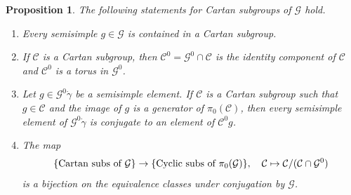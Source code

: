 \documentclass[10pt]{article}
\newtheorem{prop}{Proposition}
\theoremstyle{definition}
\theoremstyle{remark}
\newcommand{\cC}{{{\mathcal C}}}
\newcommand{\cG}{{{\mathcal G}}}
\begin{document}
\begin{prop} 
The following statements for Cartan subgroups of $\cG$ hold. 
  \begin{enumerate}
  \item Every semisimple $g\in \cG$ is contained in a Cartan subgroup.
  \item If $\cC$ is a Cartan subgroup, then $\cC^0=\cG^0\cap \cC$ is the identity component of $\cC$ and $\cC^0$ is a torus in $\cG^0$.
  \item Let $g\in \cG^0 \dot{\gamma}$ be a semisimple element. If $\cC$ is a Cartan subgroup such that $g\in \cC$ and 
    the image of ${g}$ is a generator of $\pi_0 (\cC)$, then every semisimple element of $\cG^0 \dot{\gamma}$ is conjugate to an element of $\cC^0 g$.
  \item The map
    \[
    \{\mbox{\rm{Cartan subs of }} \cG \} \rightarrow \{\mbox{\rm{Cyclic subs of }} \pi_0 (\cG) \}, \quad
    \cC \mapsto \cC / (\cC \cap \cG^0)
    \]
    is a bijection on the equivalence classes under conjugation by $\cG$. 
  \end{enumerate}  
\end{prop}  






























\end{document}
